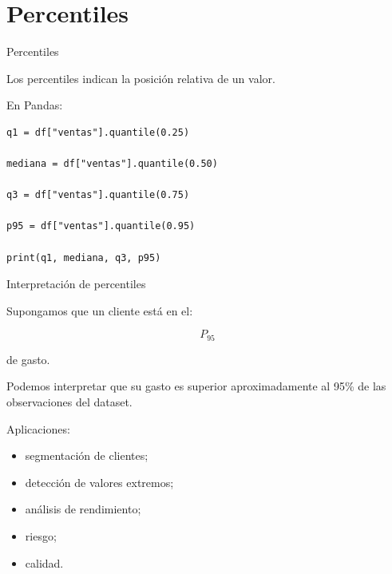 \documentclass[aspectratio=169,11pt]{beamer}
\begin{document}
\section{Percentiles}

\begin{frame}[fragile]{Percentiles}

Los percentiles indican la posición relativa de un valor.

En Pandas:

\begin{lstlisting}
q1 = df["ventas"].quantile(0.25)

mediana = df["ventas"].quantile(0.50)

q3 = df["ventas"].quantile(0.75)

p95 = df["ventas"].quantile(0.95)

print(q1, mediana, q3, p95)
\end{lstlisting}

\end{frame}


\begin{frame}{Interpretación de percentiles}

Supongamos que un cliente está en el:

\[
P_{95}
\]

de gasto.

Podemos interpretar que su gasto es superior aproximadamente al
95\% de las observaciones del dataset.

\vspace{0.4cm}

Aplicaciones:

\begin{itemize}

    \item segmentación de clientes;

    \item detección de valores extremos;

    \item análisis de rendimiento;

    \item riesgo;

    \item calidad.

\end{itemize}

\end{frame}
\end{document}
